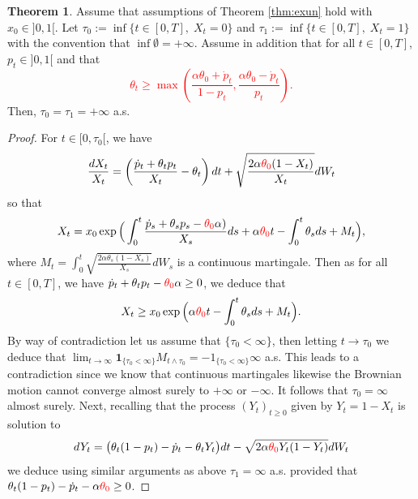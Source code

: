 \documentclass[11pt]{article}
\theoremstyle{definition}
\newtheorem{Thm}[Def]{Theorem}
\newcommand{\red}{\textcolor{red}}
\begin{document}
\begin{Thm}\label{thm:mod2}
Assume that assumptions of Theorem \ref{thm:exun} hold with $x_0\in]0,1[$.
Let $\tau_0:=\inf \{t\in[0,T],\; X_t=0\}$ and  $\tau_1:=\inf \{t\in[0,T],\; X_t=1\}$ with the convention that $\inf\emptyset=+\infty$. Assume in addition that for all $t\in[0,T]$,  $p_t\in]0,1[$ and that
\red{
\begin{equation}
\theta_t\geq \max\left(\frac{\alpha\theta_0+\dot p_t}{1-p_t},\frac{\alpha\theta_0-\dot p_t}{p_t}\right)\tag{C}. 
\end{equation}
}
 Then, $\tau_0=\tau_1=+\infty$ a.s.
\end{Thm}

\begin{proof}
For $t\in[0,\tau_0[$, we have 
$$
\frac{dX_t}{X_t}= \left(\frac{\dot p_t +\theta_t p_t}{X_t} - \theta_t\right)dt  +\sqrt{\frac{2\alpha \red{\theta_0}(1-X_t)}{X_t}} dW_t 
$$  
so that
$$
X_t=x_0\exp\Big(\int_0^t \frac{\dot p_s +\theta_sp_s- \red{\theta_0}\alpha)}{X_s}ds+\alpha\red{\theta_0}t-  \int_0^t\theta_sds + M_t\Big),
$$
where $M_t=\int_0^t\sqrt{\frac{2\alpha \theta_s(1-X_s)}{X_s}} dW_s$ is a continuous martingale. Then as for all $t\in[0,T]$, we have $\dot p_t +\theta_tp_t- \red{\theta_0}\alpha\ge0$, we deduce that
$$
X_t\ge x_0\exp\Big(\alpha\red{\theta_0}t-  \int_0^t\theta_sds + M_t\Big).
$$
By way of contradiction let us assume that  $\{\tau_0<\infty\}$, then letting $t\to \tau_0$ we deduce that $\lim_{t\to \infty} \mathbf 1_{\{\tau_0<\infty\}}M_{t\wedge \tau_0}=\mathbf -1_{\{\tau_0<\infty\}}\infty$ a.s. This leads to a contradiction since we know that continuous martingales likewise the Brownian motion cannot converge  almost surely to $+\infty$ or $-\infty$. It follows that $\tau_0=\infty$ almost surely. Next, recalling that  the process $(Y_t)_{t\geq 0}$  given by $Y_t=1-X_t$ is solution to 
$$
dY_t= \big( \theta_t(1-p_t) -\dot p_t - \theta_tY_t  \big)dt  -\sqrt{2\alpha \red{\theta_0}Y_t(1-Y_t)} dW_t 
$$
we deduce using similar arguments as above 
$\tau_1=\infty$ a.s. provided that $\theta_t(1-p_t) -\dot p_t -\alpha \red{\theta_0}\ge 0$.
 \end{proof}
\end{document}
